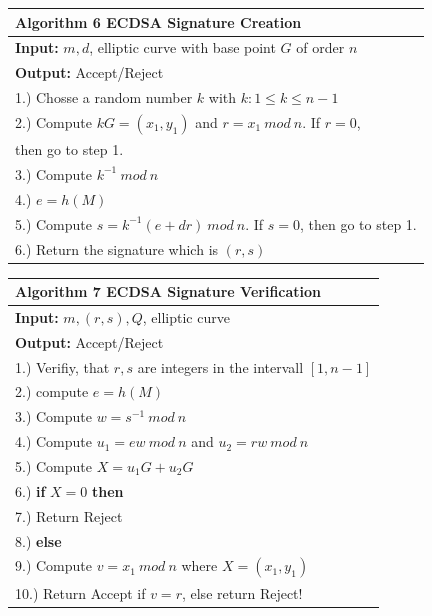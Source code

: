 \documentclass[a4paper, 10 pt, conference]{ieeeconf}
\begin{document}
\begin{table}[h!]
  \begin{center}
    \begin{tabularx}{\columnwidth}{ l   }
    \toprule
    \textbf{Algorithm 6} ECDSA Signature Creation \\ \midrule
    \textbf{Input:} $m,d$, elliptic curve with base point $G$ of order $n$ \\ 
    \textbf{Output:} Accept/Reject \\
    1.) Chosse a random number $k$ with $k: 1 \leq k \leq n-1$\\
    2.) Compute $kG = (x_1,y_1)$ and $r = x_1 \ mod \ n$. If $r=0$,\\ then go to step 1. \\
    3.) Compute $k^{-1} \ mod \ n$ \\
    4.) $e = h(M)$ \\
    5.) Compute $s = k^{-1}(e+dr) \ mod \ n$. If $s=0$, then go to step 1. \\
    6.) Return the signature which is $(r,s)$ \\
    \bottomrule
    \end{tabularx}
  \end{center}
\end{table}
\begin{table}[h!]
  \begin{center}
    \begin{tabularx}{\columnwidth}{ l   }
    \toprule
    \textbf{Algorithm 7} ECDSA Signature Verification \\ \midrule
    \textbf{Input:} $m,(r,s),Q$, elliptic curve \\ 
    \textbf{Output:} Accept/Reject \\
    1.) Verifiy, that $r,s$ are integers in the intervall $[1,n-1]$ \\
    2.) compute $e = h(M)$ \\
    3.) Compute $w = s^{-1} \ mod \ n$ \\
    4.) Compute $u_1 = ew \ mod \ n $ and $u_2 = rw \ mod \ n$ \\
    5.) Compute $X = u_1G + u_2G$ \\
    6.) \textbf{if} $X=0$ \textbf{then} \\
    7.) 	  Return Reject \\
    8.) \textbf{else} \\
    9.) Compute $v=x_1 \ mod \ n$ where $X=(x_1,y_1)$ \\
    10.) Return Accept if $v=r$, else return Reject!\\
    \bottomrule
    \end{tabularx}
  \end{center}
\end{table}
\end{document}
